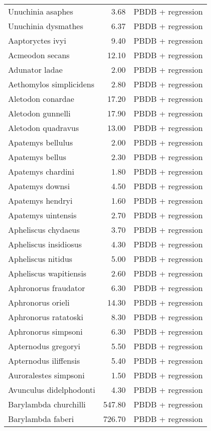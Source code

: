 \begin{table}[ht]
\begin{tabular}{lrl}
  Unuchinia asaphes & 3.68 & PBDB + regression \\ 
  Unuchinia dysmathes & 6.37 & PBDB + regression \\ 
  Aaptoryctes ivyi & 9.40 & PBDB + regression \\ 
  Acmeodon secans & 12.10 & PBDB + regression \\ 
  Adunator ladae & 2.00 & PBDB + regression \\ 
  Aethomylos simplicidens & 2.80 & PBDB + regression \\ 
  Aletodon conardae & 17.20 & PBDB + regression \\ 
  Aletodon gunnelli & 17.90 & PBDB + regression \\ 
  Aletodon quadravus & 13.00 & PBDB + regression \\ 
  Apatemys bellulus & 2.00 & PBDB + regression \\ 
  Apatemys bellus & 2.30 & PBDB + regression \\ 
  Apatemys chardini & 1.80 & PBDB + regression \\ 
  Apatemys downsi & 4.50 & PBDB + regression \\ 
  Apatemys hendryi & 1.60 & PBDB + regression \\ 
  Apatemys uintensis & 2.70 & PBDB + regression \\ 
  Apheliscus chydaeus & 3.70 & PBDB + regression \\ 
  Apheliscus insidiosus & 4.30 & PBDB + regression \\ 
  Apheliscus nitidus & 5.00 & PBDB + regression \\ 
  Apheliscus wapitiensis & 2.60 & PBDB + regression \\ 
  Aphronorus fraudator & 6.30 & PBDB + regression \\ 
  Aphronorus orieli & 14.30 & PBDB + regression \\ 
  Aphronorus ratatoski & 8.30 & PBDB + regression \\ 
  Aphronorus simpsoni & 6.30 & PBDB + regression \\ 
  Apternodus gregoryi & 5.50 & PBDB + regression \\ 
  Apternodus iliffensis & 5.40 & PBDB + regression \\ 
  Auroralestes simpsoni & 1.50 & PBDB + regression \\ 
  Avunculus didelphodonti & 4.30 & PBDB + regression \\ 
  Barylambda churchilli & 547.80 & PBDB + regression \\ 
  Barylambda faberi & 726.70 & PBDB + regression \\ 

\end{tabular}
\end{table}
